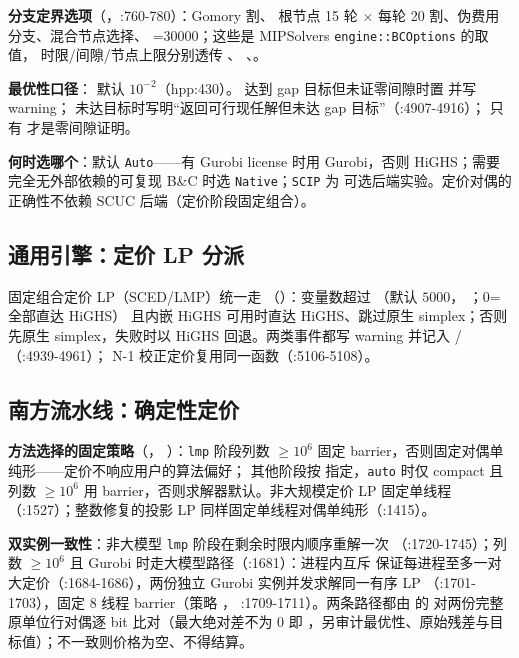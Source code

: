\textbf{分支定界选项}（，:760-780）：Gomory 割、
根节点 15 轮 $\times$ 每轮 20 割、伪费用分支、混合节点选择、
=30000；这些是 MIPSolvers \texttt{engine::BCOptions} 的取值，
时限/间隙/节点上限分别透传 、
、。

\textbf{最优性口径}： 默认 $10^{-2}$（hpp:430）。
达到 gap 目标但未证零间隙时置  并写 warning；
未达目标时写明“返回可行现任解但未达 gap 目标”（:4907-4916）；
只有  才是零间隙证明。

\textbf{何时选哪个}：默认 \texttt{Auto}——有 Gurobi license 时用 Gurobi，否则
HiGHS；需要完全无外部依赖的可复现 B\&C 时选 \texttt{Native}；\texttt{SCIP} 为
可选后端实验。定价对偶的正确性不依赖 SCUC 后端（定价阶段固定组合）。

\subsection{通用引擎：定价 LP 分派}
固定组合定价 LP（SCED/LMP）统一走 
（）：变量数超过
（默认 $5000$，
；$0$=全部直达 HiGHS）
且内嵌 HiGHS 可用时直达 HiGHS、跳过原生 simplex；否则先原生 simplex，失败时以
HiGHS 回退。两类事件都写 warning 并记入
/%
（:4939-4961）；
N-1 校正定价复用同一函数（:5106-5108）。

\subsection{南方流水线：确定性定价}
\textbf{方法选择的固定策略}（，
）：\texttt{lmp} 阶段列数
$\ge10^{6}$ 固定 barrier，否则固定对偶单纯形——定价不响应用户的算法偏好；
其他阶段按  指定，\texttt{auto} 时仅 compact 且
列数 $\ge10^{6}$ 用 barrier，否则求解器默认。非大规模定价 LP 固定单线程
（:1527）；整数修复的投影 LP 同样固定单线程对偶单纯形（:1415）。

\textbf{双实例一致性}：非大模型 \texttt{lmp} 阶段在剩余时限内顺序重解一次
（:1720-1745）；列数 $\ge10^{6}$ 且 Gurobi 时走大模型路径（:1681）：进程内互斥
保证每进程至多一对大定价（:1684-1686），两份独立 Gurobi 实例并发求解同一有序 LP
（:1701-1703），固定 8 线程 barrier（策略 ，
:1709-1711）。两条路径都由
 的
 对两份完整原单位行对偶逐 bit 比对（最大绝对差不为 0 即
，另审计最优性、原始残差与目标值）；不一致则价格为空、不得结算。

